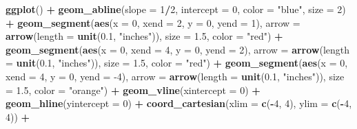 \documentclass[
]{book}
\newenvironment{Shaded}{\begin{snugshade}}{\end{snugshade}}
\newcommand{\DataTypeTok}[1]{\textcolor[rgb]{0.13,0.29,0.53}{#1}}
\newcommand{\DecValTok}[1]{\textcolor[rgb]{0.00,0.00,0.81}{#1}}
\newcommand{\FloatTok}[1]{\textcolor[rgb]{0.00,0.00,0.81}{#1}}
\newcommand{\KeywordTok}[1]{\textcolor[rgb]{0.13,0.29,0.53}{\textbf{#1}}}
\newcommand{\NormalTok}[1]{#1}
\newcommand{\OperatorTok}[1]{\textcolor[rgb]{0.81,0.36,0.00}{\textbf{#1}}}
\newcommand{\StringTok}[1]{\textcolor[rgb]{0.31,0.60,0.02}{#1}}
\theoremstyle{definition}
\theoremstyle{definition}
\theoremstyle{definition}
\theoremstyle{definition}
\theoremstyle{remark}
\begin{document}
\begin{Shaded}
\begin{Highlighting}[]
\KeywordTok{ggplot}\NormalTok{() }\OperatorTok{+}
\StringTok{    }\KeywordTok{geom_abline}\NormalTok{(}\DataTypeTok{slope =} \DecValTok{1}\OperatorTok{/}\DecValTok{2}\NormalTok{, }\DataTypeTok{intercept =} \DecValTok{0}\NormalTok{, }\DataTypeTok{color =} \StringTok{"blue"}\NormalTok{, }\DataTypeTok{size =} \DecValTok{2}\NormalTok{) }\OperatorTok{+}\StringTok{  }
\StringTok{    }\KeywordTok{geom_segment}\NormalTok{(}\KeywordTok{aes}\NormalTok{(}\DataTypeTok{x =} \DecValTok{0}\NormalTok{, }\DataTypeTok{xend =} \DecValTok{2}\NormalTok{, }\DataTypeTok{y =} \DecValTok{0}\NormalTok{, }\DataTypeTok{yend =} \DecValTok{1}\NormalTok{), }\DataTypeTok{arrow =} \KeywordTok{arrow}\NormalTok{(}\DataTypeTok{length =} \KeywordTok{unit}\NormalTok{(}\FloatTok{0.1}\NormalTok{, }\StringTok{"inches"}\NormalTok{)), }\DataTypeTok{size =} \FloatTok{1.5}\NormalTok{, }\DataTypeTok{color =} \StringTok{"red"}\NormalTok{) }\OperatorTok{+}
\StringTok{    }\KeywordTok{geom_segment}\NormalTok{(}\KeywordTok{aes}\NormalTok{(}\DataTypeTok{x =} \DecValTok{0}\NormalTok{, }\DataTypeTok{xend =} \DecValTok{4}\NormalTok{, }\DataTypeTok{y =} \DecValTok{0}\NormalTok{, }\DataTypeTok{yend =} \DecValTok{2}\NormalTok{), }\DataTypeTok{arrow =} \KeywordTok{arrow}\NormalTok{(}\DataTypeTok{length =} \KeywordTok{unit}\NormalTok{(}\FloatTok{0.1}\NormalTok{, }\StringTok{"inches"}\NormalTok{)), }\DataTypeTok{size =} \FloatTok{1.5}\NormalTok{, }\DataTypeTok{color =} \StringTok{"red"}\NormalTok{) }\OperatorTok{+}
\StringTok{    }\KeywordTok{geom_segment}\NormalTok{(}\KeywordTok{aes}\NormalTok{(}\DataTypeTok{x =} \DecValTok{0}\NormalTok{, }\DataTypeTok{xend =} \DecValTok{4}\NormalTok{, }\DataTypeTok{y =} \DecValTok{0}\NormalTok{, }\DataTypeTok{yend =} \DecValTok{-4}\NormalTok{), }\DataTypeTok{arrow =} \KeywordTok{arrow}\NormalTok{(}\DataTypeTok{length =} \KeywordTok{unit}\NormalTok{(}\FloatTok{0.1}\NormalTok{, }\StringTok{"inches"}\NormalTok{)), }\DataTypeTok{size =} \FloatTok{1.5}\NormalTok{, }\DataTypeTok{color =} \StringTok{"orange"}\NormalTok{) }\OperatorTok{+}
\StringTok{    }\KeywordTok{geom_vline}\NormalTok{(}\DataTypeTok{xintercept =} \DecValTok{0}\NormalTok{) }\OperatorTok{+}\StringTok{ }
\StringTok{    }\KeywordTok{geom_hline}\NormalTok{(}\DataTypeTok{yintercept =} \DecValTok{0}\NormalTok{) }\OperatorTok{+}
\StringTok{    }\KeywordTok{coord_cartesian}\NormalTok{(}\DataTypeTok{xlim =} \KeywordTok{c}\NormalTok{(}\OperatorTok{-}\DecValTok{4}\NormalTok{, }\DecValTok{4}\NormalTok{), }\DataTypeTok{ylim =} \KeywordTok{c}\NormalTok{(}\OperatorTok{-}\DecValTok{4}\NormalTok{, }\DecValTok{4}\NormalTok{))  }\OperatorTok{+}

\end{Highlighting}
\end{Shaded}
\end{document}
